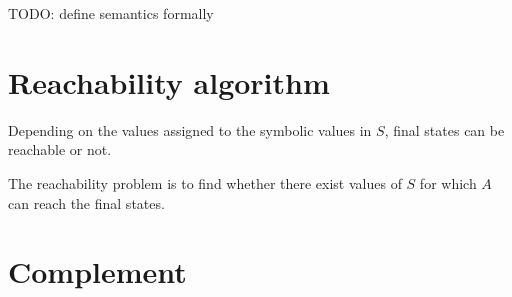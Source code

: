 \documentclass{article}
\newcommand{\loris}{\textcolor[rgb]{0.00,0.00,1.00}}
\begin{document}
\loris{TODO: define semantics formally}

\section{Reachability algorithm}

Depending on the values assigned to the symbolic values in $S$, final states can be reachable or not.

The reachability problem is to find whether there exist values of $S$ for which $A$ can reach the final states.

\section{Complement}
\end{document}
